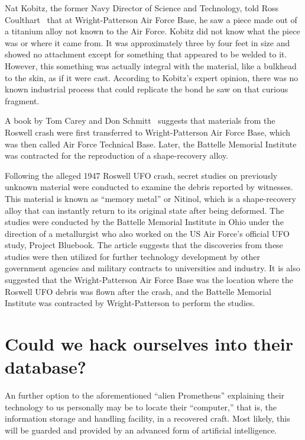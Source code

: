 Nat Kobitz, the former Navy Director of Science and Technology, told Ross Coulthart~\cite{Coulthart2021Aug} that at Wright-Patterson Air Force Base, he saw a piece made out of a titanium alloy not known to the Air Force. Kobitz did not know what the piece was or where it came from. It was approximately three by four feet in size and showed no attachment except for something that appeared to be welded to it. However, this something was actually integral with the material, like a bulkhead to the skin, as if it were cast. According to Kobitz's expert opinion, there was no known industrial process that could replicate the bond he saw on that curious fragment.






A book by Tom Carey and Don Schmitt~\cite{CareySchmitt} suggests that materials from the Roswell crash were first transferred to Wright-Patterson Air Force Base, which was then called Air Force Technical Base. Later, the Battelle Memorial Institute was contracted for the reproduction of a shape-recovery alloy.

Following the alleged 1947 Roswell UFO crash, secret studies on previously unknown material were conducted to examine the debris reported by witnesses. This material is known as ``memory metal'' or Nitinol, which is a shape-recovery alloy that can instantly return to its original state after being deformed. The studies were conducted by the Battelle Memorial Institute in Ohio under the direction of a metallurgist who also worked on the US Air Force's official UFO study, Project Bluebook. The article suggests that the discoveries from these studies were then utilized for further technology development by other government agencies and military contracts to universities and industry. It is also suggested that the Wright-Patterson Air Force Base was the location where the Roswell UFO debris was flown after the crash, and the Battelle Memorial Institute was contracted by Wright-Patterson to perform the studies.



\section{Could we hack ourselves into their database?}
\label{2023-UFO-part-Perception-crash-retreivals-hack}


An further option to the aforementioned ``alien Prometheus'' explaining their technology to us personally may be to locate their ``computer,''
that is, the information storage and handling facility, in a recovered craft.
Most likely, this will be guarded and provided by an advanced form of artificial intelligence.

